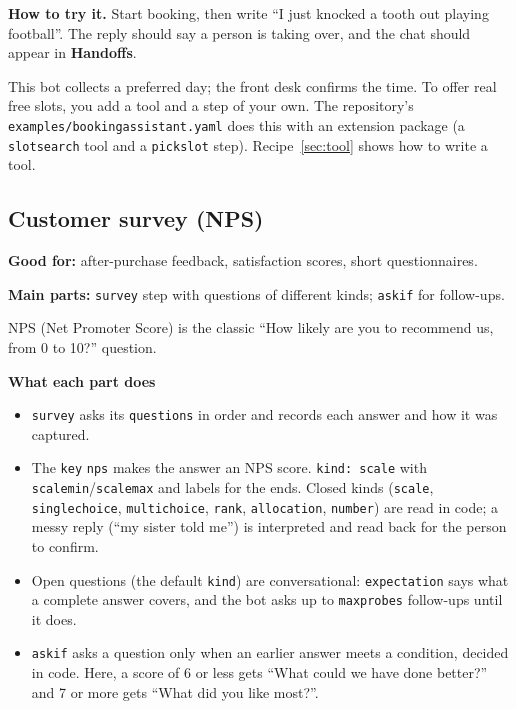 \documentclass[11pt,a4paper]{article}
\newcommand{\snip}[1]{}
\newcommand{\codeus}{\textunderscore\allowbreak}
\newcommand{\code}[1]{{\renewcommand{\_}{\codeus}\texttt{\upshape #1}}}
\newcommand{\key}[1]{{\renewcommand{\_}{\codeus}\texttt{\color{ckey}#1}}}
\newcommand{\recipehead}[2]{%
  \begin{tcolorbox}[enhanced,colback=boxE,colframe=boxE,arc=2pt,left=8pt,right=8pt,top=4pt,bottom=4pt]
  \small\textbf{\color{keel}Good for:} #1\par
  \textbf{\color{keel}Main parts:} #2
  \end{tcolorbox}}
\begin{document}
\textbf{How to try it.} Start booking, then write ``I just knocked a tooth out playing football''. The reply should
say a person is taking over, and the chat should appear in \textbf{Handoffs}.

\begin{note}
This bot collects a preferred day; the front desk confirms the time. To offer real free slots, you add a tool and
a step of your own. The repository's \code{examples/booking\_assistant.yaml} does this with an extension package
(a \code{slot\_search} tool and a \code{pick\_slot} step). Recipe~\ref{sec:tool} shows how to write a tool.
\end{note}

\subsection{Customer survey (NPS)}
\recipehead{after-purchase feedback, satisfaction scores, short questionnaires.}%
{\key{survey} step with questions of different kinds; \code{ask\_if} for follow-ups.}

NPS (Net Promoter Score) is the classic ``How likely are you to recommend us, from 0 to 10?'' question.

\snip{04_survey.yaml}

\textbf{What each part does}
\begin{itemize}[leftmargin=1.2em]
  \item \key{survey} asks its \key{questions} in order and records each answer and how it was captured.
  \item The \key{key} \code{nps} makes the answer an NPS score. \code{kind: scale} with \key{scale\_min}/\key{scale\_max}
    and labels for the ends. Closed kinds (\code{scale}, \code{single\_choice}, \code{multi\_choice}, \code{rank},
    \code{allocation}, \code{number}) are read in code; a messy reply (``my sister told me'') is interpreted and
    read back for the person to confirm.
  \item Open questions (the default \key{kind}) are conversational: \key{expectation} says what a complete answer
    covers, and the bot asks up to \key{max\_probes} follow-ups until it does.
  \item \key{ask\_if} asks a question only when an earlier answer meets a condition, decided in code. Here, a score
    of 6 or less gets ``What could we have done better?'' and 7 or more gets ``What did you like most?''.
\end{itemize}
\end{document}
